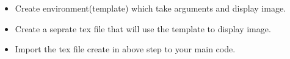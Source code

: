 \begin{itemize}
    \item Create environment(template) which take arguments and display image.
    \item Create a seprate tex file that will use the template to display image.
    \item Import the tex file create in above step to your main code.
\end{itemize}
